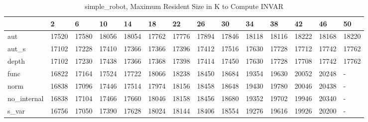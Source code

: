 \begin{table}
\caption{simple_robot, Maximum Resident Size in K to Compute INVAR}
\label{simple_robot_INVAR_size}
\begin{tabular}{llllllllllllll}
\toprule
 & 2 & 6 & 10 & 14 & 18 & 22 & 26 & 30 & 34 & 38 & 42 & 46 & 50 \\
\midrule
aut & 17520 & 17580 & 18056 & 18054 & 17762 & 17776 & 17894 & 17846 & 18118 & 18116 & 18222 & 18168 & 18220 \\
aut_s & 17102 & 17228 & 17410 & 17366 & 17366 & 17396 & 17412 & 17516 & 17630 & 17728 & 17712 & 17742 & 17762 \\
depth & 17102 & 17230 & 17438 & 17366 & 17368 & 17398 & 17414 & 17450 & 17630 & 17728 & 17708 & 17742 & 17762 \\
func & 16822 & 17164 & 17524 & 17722 & 18066 & 18238 & 18450 & 18684 & 19354 & 19630 & 20052 & 20248 & - \\
norm & 16838 & 17096 & 17446 & 17514 & 17974 & 18156 & 18458 & 18648 & 19430 & 19780 & 20046 & 20438 & - \\
no_internal & 16838 & 17104 & 17466 & 17660 & 18046 & 18158 & 18456 & 18680 & 19352 & 19702 & 19946 & 20340 & - \\
s_var & 16756 & 17050 & 17390 & 17628 & 18024 & 18144 & 18406 & 18554 & 19276 & 19616 & 19926 & 20200 & - \\
\bottomrule
\end{tabular}
\end{table}
